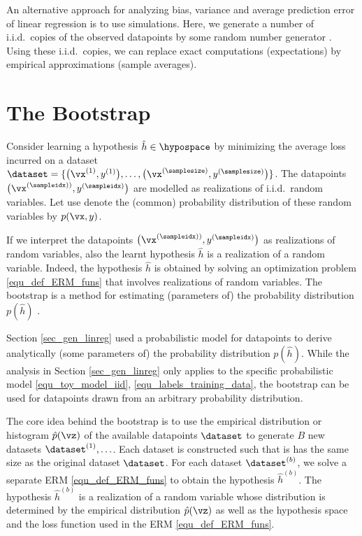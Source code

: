 \documentclass[12pt]{report}
\begin{document}
An alternative approach for analyzing bias, variance and average 
prediction error of linear regression is to use simulations. Here, we 
generate a number of i.i.d.\ copies of the observed datapoints by 
some random number generator \cite{Andrieu2001}. Using these 
i.i.d.\ copies, we can replace exact computations (expectations) 
by empirical approximations (sample averages).  

\section{The Bootstrap} 
\label{sec_the_bootsrap}

Consider learning a hypothesis $\hat{h} \in \hypospace$ by minimizing the 
average loss incurred on a dataset $\dataset=\{ \big(\vx^{(1)},y^{(1)}\big),\ldots,\big(\vx^{(\samplesize)},y^{(\samplesize)}\big)\}$. 
The datapoints $\big(\vx^{(\sampleidx))},y^{(\sampleidx)}\big)$ are modelled 
as realizations of i.i.d.\ random variables. Let use denote the (common) probability 
distribution of these random variables by $p(\vx,y)$. 

If we interpret the datapoints $\big(\vx^{(\sampleidx))},y^{(\sampleidx)}\big)$ as realizations of 
random variables, also the learnt hypothesis $\hat{h}$ is a realization  
of a random variable. Indeed, the hypothesis $\hat{h}$ is obtained by 
solving an optimization problem \eqref{equ_def_ERM_funs} that involves 
realizations of random variables. The bootstrap is a method for estimating 
(parameters of) the probability distribution $p(\hat{h})$ \cite{hastie01statisticallearning}.  

Section \ref{sec_gen_linreg} used a probabilistic model for 
datapoints to derive analytically (some parameters of) the probability 
distribution $p(\hat{h})$. While the analysis in Section \ref{sec_gen_linreg} 
only applies to the specific probabilistic model \eqref{equ_toy_model_iid}, \eqref{equ_labels_training_data}, 
the bootstrap can be used for datapoints drawn from an arbitrary 
probability distribution. 

The core idea behind the bootstrap is to use the empirical distribution 
or histogram $\hat{p}(\vz)$ of the available datapoints $\dataset$ to 
generate $B$ new datasets $\dataset^{(1)},\ldots$. Each dataset is 
constructed such that is has the same size as the original dataset $\dataset$. 
For each dataset $\dataset^{(b)}$, we solve a separate ERM \eqref{equ_def_ERM_funs} 
to obtain the hypothesis $\hat{h}^{(b)}$. The hypothesis $\hat{h}^{(b)}$ is a realization 
of a random variable whose distribution is determined by the empirical distribution 
$\hat{p}(\vz)$ as well as the hypothesis space and the loss function 
used in the ERM \eqref{equ_def_ERM_funs}. 
\end{document}
